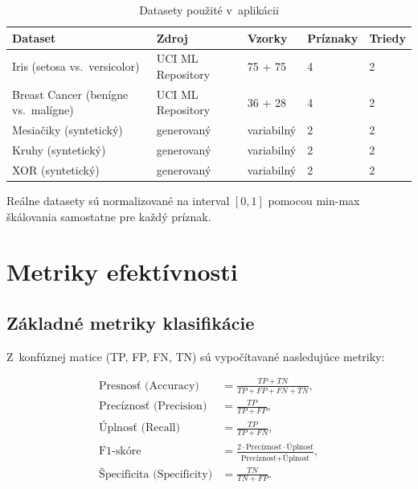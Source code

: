 \documentclass[12pt,a4paper]{article}
\begin{document}
\begin{table}[H]
  \centering
  \caption{Datasety použité v~aplikácii}
  \begin{tabular}{lllll}
    \toprule
    \textbf{Dataset} & \textbf{Zdroj} & \textbf{Vzorky}
      & \textbf{Príznaky} & \textbf{Triedy} \\
    \midrule
    Iris (setosa vs.\ versicolor)
      & UCI ML Repository & 75 + 75 & 4 & 2 \\
    Breast Cancer (benígne vs.\ malígne)
      & UCI ML Repository & 36 + 28 & 4 & 2 \\
    Mesiačiky (syntetický)
      & generovaný & variabilný & 2 & 2 \\
    Kruhy (syntetický)
      & generovaný & variabilný & 2 & 2 \\
    XOR (syntetický)
      & generovaný & variabilný & 2 & 2 \\
    \bottomrule
  \end{tabular}
  \label{tab:datasety}
\end{table}

Reálne datasety sú normalizované na interval $[0, 1]$ pomocou min-max
škálovania samostatne pre každý príznak.

\section{Metriky efektívnosti}

\subsection{Základné metriky klasifikácie}

Z~konfúznej matice (TP, FP, FN, TN) sú vypočítavané nasledujúce metriky:

\begin{align}
  \text{Presnosť (Accuracy)} &= \frac{TP + TN}{TP + FP + FN + TN}, \\[6pt]
  \text{Precíznosť (Precision)} &= \frac{TP}{TP + FP}, \\[6pt]
  \text{Úplnosť (Recall)} &= \frac{TP}{TP + FN}, \\[6pt]
  \text{F1-skóre} &= \frac{2 \cdot \text{Precíznosť} \cdot \text{Úplnosť}}
    {\text{Precíznosť} + \text{Úplnosť}}, \\[6pt]
  \text{Špecificita (Specificity)} &= \frac{TN}{TN + FP}.
\end{align}
\end{document}
